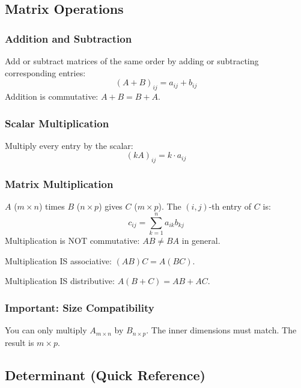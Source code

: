 \documentclass[
]{article}
\begin{document}
\subsection{Matrix Operations}\label{matrix-operations}

\subsubsection{Addition and Subtraction}\label{addition-and-subtraction}

Add or subtract matrices of the same order by adding or subtracting
corresponding entries:
\[
(A + B)_{ij} = a_{ij} + b_{ij}
\]
Addition is commutative: \(A + B = B + A\).

\subsubsection{Scalar Multiplication}\label{scalar-multiplication}

Multiply every entry by the scalar:
\[
(kA)_{ij} = k \cdot a_{ij}
\]
\subsubsection{Matrix Multiplication}\label{matrix-multiplication}

\(A\) (\(m \times n\)) times \(B\) (\(n \times p\)) gives \(C\)
(\(m \times p\)). The \((i,j)\)-th entry of \(C\) is:
\[
c_{ij} = \sum_{k=1}^{n} a_{ik} b_{kj}
\]
Multiplication is NOT commutative: \(AB \neq BA\) in general.

Multiplication IS associative: \((AB)C = A(BC)\).

Multiplication IS distributive: \(A(B + C) = AB + AC\).

\subsubsection{Important: Size
Compatibility}\label{important-size-compatibility}

You can only multiply \(A_{m \times n}\) by \(B_{n \times p}\). The
inner dimensions must match. The result is \(m \times p\).

\subsection{Determinant (Quick
Reference)}\label{determinant-quick-reference}
\end{document}
